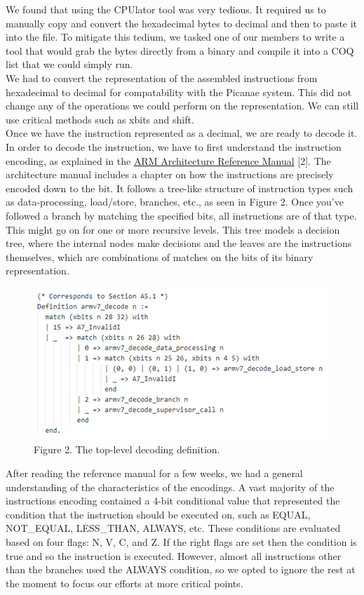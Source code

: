 \documentclass[twocolumn]{article}
\begin{document}
We found that using the CPUlator tool was very tedious. It required us to manually copy and convert the hexadecimal bytes to decimal and then to paste it into the file. To mitigate this tedium, we tasked one of our members to write a tool that would grab the bytes directly from a binary and compile it into a COQ list that we could simply run.\\

We had to convert the representation of the assembled instructions from hexadecimal to decimal for compatability with the Picanae system. This did not change any of the operations we could perform on the representation. We can still use critical methods such as xbits and shift.\\

Once we have the instruction represented as a decimal, we are ready to decode it. In order to decode the instruction, we have to first understand the instruction encoding, as explained in the \href{https://developer.arm.com/documentation/ddi0406/c}{ARM Architecture Reference Manual} [2]. The architecture manual includes a chapter on how the instructions are precisely encoded down to the bit. It follows a tree-like structure of instruction types such as data-processing, load/store, branches, etc., as seen in Figure 2.  Once you’ve followed a branch by matching the specified bits, all instructions are of that type. This might go on for one or more recursive levels. This tree models a decision tree, where the internal nodes make decisions and the leaves are the instructions themselves, which are combinations of matches on the bits of its binary representation.\\
\begin{figure}[!ht]
\centering
\includegraphics[width=.5\textwidth]{top-level_decode.png}\\
Figure 2. The top-level decoding definition.
\end{figure}
After reading the reference manual for a few weeks, we had a general understanding of the characteristics of the encodings. A vast majority of the instructions encoding contained a 4-bit conditional value that represented the condition that the instruction should be executed on, such as EQUAL, NOT\_EQUAL, LESS\_THAN, ALWAYS, etc. These conditions are evaluated based on four flags: N, V, C, and Z. If the right flags are set then the condition is true and so the instruction is executed. However, almost all instructions other than the branches used the ALWAYS condition, so we opted to ignore the rest at the moment to focus our efforts at more critical points.\\
\end{document}

